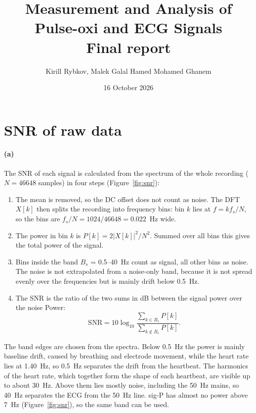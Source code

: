\documentclass[11pt,a4paper]{article}
\title{Measurement and Analysis of Pulse-oxi and ECG Signals\\
       \large Final report}
\author{Kirill Rybkov, Malek Galal Hamed Mohamed Ghanem}
\date{16 October 2026}
\begin{document}
\maketitle

\section{SNR of raw data}\label{sec:snr}

\paragraph{(a)} The SNR of each signal is calculated from the spectrum of the whole recording
($N = 46648$ samples) in four steps (Figure~\ref{fig:snr}):
\begin{enumerate}
  \item The mean is removed, so the DC offset does not count as noise. The DFT $X[k]$ then
        splits the recording into frequency bins: bin $k$ lies at $f = k f_s/N$, so the bins are
        $f_s/N = 1024/46648 = 0.022$~Hz wide.
  \item The power in bin $k$ is $P[k] = 2|X[k]|^2/N^2$. Summed over all bins this gives the total
        power of the signal.
  \item Bins inside the band $B_s$ = 0.5--40~Hz count as signal, all other bins as noise. The noise is not extrapolated from a noise-only band, because it is not spread evenly over the
        frequencies but is mainly drift below 0.5~Hz.
  \item The SNR is the ratio of the two sums in dB between the signal power over the noise Power:
        \[
          \mathrm{SNR} = 10\log_{10}\frac{\sum_{k \in B_s} P[k]}{\sum_{k \notin B_s} P[k]}.
        \]
\end{enumerate}
The band edges are chosen from the spectra. Below 0.5~Hz the power is mainly baseline drift,
caused by breathing and electrode movement, while the heart rate lies at 1.40~Hz, so 0.5~Hz
separates the drift from the heartbeat. The harmonics of the heart rate, which together form the
shape of each heartbeat, are visible up to about 30~Hz. Above them lies mostly noise, including the
50~Hz mains, so 40~Hz separates the ECG from the 50~Hz line. sig-P has almost no power above 7~Hz
(Figure~\ref{fig:snr}), so the same band can be used.
\end{document}
